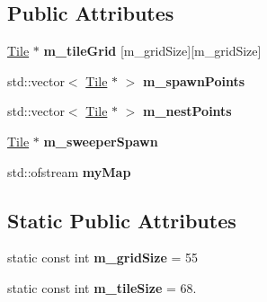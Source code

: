 \subsection*{Public Attributes}
\begin{DoxyCompactItemize}
\item 
\mbox{\label{class_grid_a5bf5954db3a1f042a61b1a401516c8fc}} 
\mbox{\hyperlink{class_tile}{Tile}} $\ast$ {\bfseries m\+\_\+tile\+Grid} \mbox{[}m\+\_\+grid\+Size\mbox{]}\mbox{[}m\+\_\+grid\+Size\mbox{]}
\item 
\mbox{\label{class_grid_a25dc059d0531a3c7d1cfbc8734149bb4}} 
std\+::vector$<$ \mbox{\hyperlink{class_tile}{Tile}} $\ast$ $>$ {\bfseries m\+\_\+spawn\+Points}
\item 
\mbox{\label{class_grid_abbffd863ba487e5008577ae9fff7cb8b}} 
std\+::vector$<$ \mbox{\hyperlink{class_tile}{Tile}} $\ast$ $>$ {\bfseries m\+\_\+nest\+Points}
\item 
\mbox{\label{class_grid_a8892db395a32d20ea8d33a9d2c76cc02}} 
\mbox{\hyperlink{class_tile}{Tile}} $\ast$ {\bfseries m\+\_\+sweeper\+Spawn}
\item 
\mbox{\label{class_grid_a6d4645cfec23eff4a965d939f17fb531}} 
std\+::ofstream {\bfseries my\+Map}
\end{DoxyCompactItemize}
\subsection*{Static Public Attributes}
\begin{DoxyCompactItemize}
\item 
\mbox{\label{class_grid_a9d4a2f15f6e33badcf872ce2252f27f1}} 
static const int {\bfseries m\+\_\+grid\+Size} = 55
\item 
\mbox{\label{class_grid_a773a3f87032f074f42e2983ef4ce71e1}} 
static const int {\bfseries m\+\_\+tile\+Size} = 68.
\end{DoxyCompactItemize}
